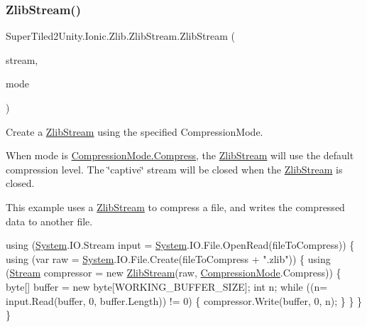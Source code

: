 \subsubsection{\texorpdfstring{Zlib\+Stream()}{ZlibStream()}\hspace{0.1cm}{\footnotesize\ttfamily [1/4]}}
{\footnotesize\ttfamily Super\+Tiled2\+Unity.\+Ionic.\+Zlib.\+Zlib\+Stream.\+Zlib\+Stream (\begin{DoxyParamCaption}\item[{System.\+I\+O.\+Stream}]{stream,  }\item[{\mbox{\hyperlink{namespace_super_tiled2_unity_1_1_ionic_1_1_zlib_ad5b7635d92497e1c905e5de82eb1c6b1}{Compression\+Mode}}}]{mode }\end{DoxyParamCaption})}



Create a {\ttfamily \mbox{\hyperlink{class_super_tiled2_unity_1_1_ionic_1_1_zlib_1_1_zlib_stream}{Zlib\+Stream}}} using the specified {\ttfamily Compression\+Mode}. 

When mode is {\ttfamily \mbox{\hyperlink{namespace_super_tiled2_unity_1_1_ionic_1_1_zlib_ad5b7635d92497e1c905e5de82eb1c6b1a8fa4fcfcda70410e089984d5f51ae97d}{Compression\+Mode.\+Compress}}}, the {\ttfamily \mbox{\hyperlink{class_super_tiled2_unity_1_1_ionic_1_1_zlib_1_1_zlib_stream}{Zlib\+Stream}}} will use the default compression level. The \char`\"{}captive\char`\"{} stream will be closed when the {\ttfamily \mbox{\hyperlink{class_super_tiled2_unity_1_1_ionic_1_1_zlib_1_1_zlib_stream}{Zlib\+Stream}}} is closed. 

This example uses a {\ttfamily \mbox{\hyperlink{class_super_tiled2_unity_1_1_ionic_1_1_zlib_1_1_zlib_stream}{Zlib\+Stream}}} to compress a file, and writes the compressed data to another file. 
\begin{DoxyCode}
\textcolor{keyword}{using} (\mbox{\hyperlink{namespace_system}{System}}.IO.Stream input = \mbox{\hyperlink{namespace_system}{System}}.IO.File.OpenRead(fileToCompress))
\{
    \textcolor{keyword}{using} (var raw = \mbox{\hyperlink{namespace_system}{System}}.IO.File.Create(fileToCompress + \textcolor{stringliteral}{".zlib"}))
    \{
        \textcolor{keyword}{using} (\mbox{\hyperlink{namespace_super_tiled2_unity_1_1_ionic_1_1_zip_a9ced5352c56e7e0fceff15b534073c83aeae835e83c0494a376229f254f7d3392}{Stream}} compressor = \textcolor{keyword}{new} \mbox{\hyperlink{class_super_tiled2_unity_1_1_ionic_1_1_zlib_1_1_zlib_stream_a626c8b9a6ae8fffc521a24efc94f6f39}{ZlibStream}}(raw, 
      \mbox{\hyperlink{namespace_super_tiled2_unity_1_1_ionic_1_1_zlib_ad5b7635d92497e1c905e5de82eb1c6b1}{CompressionMode}}.Compress))
        \{
            byte[] buffer = \textcolor{keyword}{new} byte[WORKING\_BUFFER\_SIZE];
            \textcolor{keywordtype}{int} n;
            \textcolor{keywordflow}{while} ((n= input.Read(buffer, 0, buffer.Length)) != 0)
            \{
                compressor.Write(buffer, 0, n);
            \}
        \}
    \}
\}
\end{DoxyCode}
 
